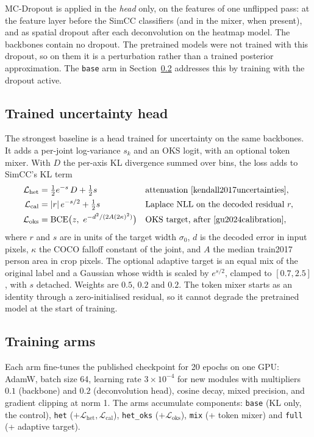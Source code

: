 \documentclass[preprint,11pt]{elsarticle}
\begin{document}
MC-Dropout is applied in the \emph{head} only, on the features of one unflipped pass:
at the feature layer before the SimCC classifiers (and in the mixer, when present), and as
spatial dropout after each deconvolution on the heatmap model. The backbones contain no dropout.
The pretrained models were not trained with this dropout, so on them it is a perturbation rather
than a trained posterior approximation. The \texttt{base} arm in Section~\ref{sec:arms} addresses
this by training with the dropout active.

\subsection{Trained uncertainty head}\label{sec:learned}

The strongest baseline is a head trained for uncertainty on the same backbones. It adds a per-joint log-variance $s_k$ and an OKS logit, with an optional token mixer. With
$D$ the per-axis KL divergence summed over bins, the loss adds to SimCC's KL term
\begin{align}
\mathcal{L}_{\text{het}} &= \tfrac{1}{2} e^{-s}\, D + \tfrac{1}{2} s
  && \text{attenuation~\cite{kendall2017uncertainties}},\\
\mathcal{L}_{\text{cal}} &= |r|\, e^{-s/2} + \tfrac{1}{2} s
  && \text{Laplace NLL on the decoded residual } r,\\
\mathcal{L}_{\text{oks}} &= \mathrm{BCE}\big(z,\ e^{-d^2 / (2A(2\kappa)^2)}\big)
  && \text{OKS target, after~\cite{gu2024calibration}},
\end{align}
where $r$ and $s$ are in units of the target width $\sigma_0$, $d$ is the decoded error in input
pixels, $\kappa$ the COCO falloff constant of the joint, and $A$ the median train2017 person area
in crop pixels. The optional adaptive target is an equal mix of the original label and a Gaussian whose width is
scaled by $e^{s/2}$, clamped to $[0.7, 2.5]$, with $s$ detached. Weights are $0.5$, $0.2$ and $0.2$. The token mixer starts as an
identity through a zero-initialised residual, so it cannot degrade the pretrained model at the
start of training.

\subsection{Training arms}\label{sec:arms}

Each arm fine-tunes the published checkpoint for 20 epochs on one GPU: AdamW, batch size 64,
learning rate $3\times10^{-4}$ for new modules with multipliers $0.1$ (backbone) and $0.2$
(deconvolution head), cosine decay, mixed precision, and gradient clipping at norm 1. The arms
accumulate components: \texttt{base} (KL only, the control), \texttt{het}
($+\mathcal{L}_{\text{het}},\mathcal{L}_{\text{cal}}$), \texttt{het\_oks}
($+\mathcal{L}_{\text{oks}}$), \texttt{mix} (+ token mixer) and \texttt{full} (+ adaptive target).
\end{document}
